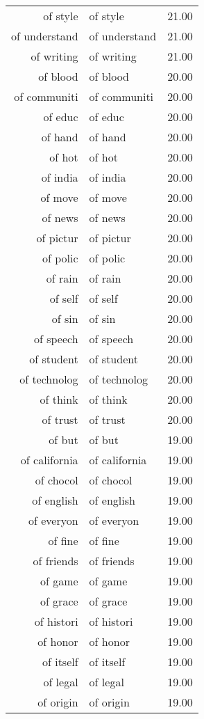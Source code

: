 \begin{table}[ht]
\begin{tabular}{rlr}
  of style & of style & 21.00 \\ 
  of understand & of understand & 21.00 \\ 
  of writing & of writing & 21.00 \\ 
  of blood & of blood & 20.00 \\ 
  of communiti & of communiti & 20.00 \\ 
  of educ & of educ & 20.00 \\ 
  of hand & of hand & 20.00 \\ 
  of hot & of hot & 20.00 \\ 
  of india & of india & 20.00 \\ 
  of move & of move & 20.00 \\ 
  of news & of news & 20.00 \\ 
  of pictur & of pictur & 20.00 \\ 
  of polic & of polic & 20.00 \\ 
  of rain & of rain & 20.00 \\ 
  of self & of self & 20.00 \\ 
  of sin & of sin & 20.00 \\ 
  of speech & of speech & 20.00 \\ 
  of student & of student & 20.00 \\ 
  of technolog & of technolog & 20.00 \\ 
  of think & of think & 20.00 \\ 
  of trust & of trust & 20.00 \\ 
  of but & of but & 19.00 \\ 
  of california & of california & 19.00 \\ 
  of chocol & of chocol & 19.00 \\ 
  of english & of english & 19.00 \\ 
  of everyon & of everyon & 19.00 \\ 
  of fine & of fine & 19.00 \\ 
  of friends & of friends & 19.00 \\ 
  of game & of game & 19.00 \\ 
  of grace & of grace & 19.00 \\ 
  of histori & of histori & 19.00 \\ 
  of honor & of honor & 19.00 \\ 
  of itself & of itself & 19.00 \\ 
  of legal & of legal & 19.00 \\ 
  of origin & of origin & 19.00 \\ 

\end{tabular}
\end{table}

